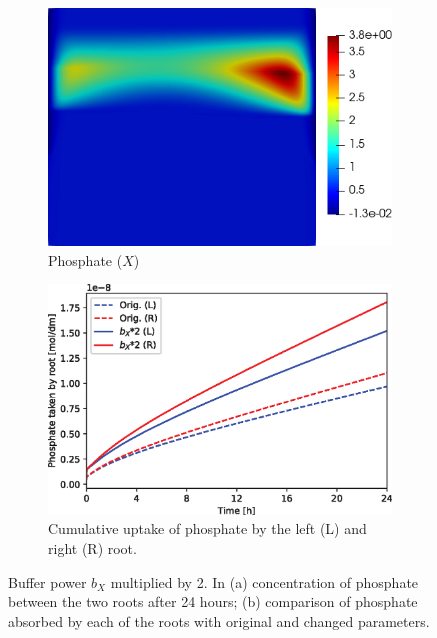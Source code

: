 \documentclass[11pt]{article}
\numberwithin{equation}{section}
\begin{document}
\begin{figure}[!htb]
\centering
\begin{subfigure}[t]{0.35\textwidth}
    \includegraphics[width=\textwidth]{Figures/X_bXtimes2.png}
    \caption{Phosphate ($X$)}
    \label{fig:numexp_bxup1}
\end{subfigure}
\hspace{1cm}
\begin{subfigure}[t]{0.45\textwidth}
    \includegraphics[width=\textwidth]{Figures/bxtimes2.eps}
    \caption{Cumulative uptake of phosphate by the left (L) and right (R) root.}
    \label{fig:numexp_bxup2}
\end{subfigure}
\caption{Buffer power $b_X$ multiplied by 2. In (a) concentration of phosphate between the two roots after 24 hours; (b) comparison of phosphate absorbed by each of the roots with original and changed parameters.}
\label{fig:numexp_bxup}
\end{figure}
\end{document}
